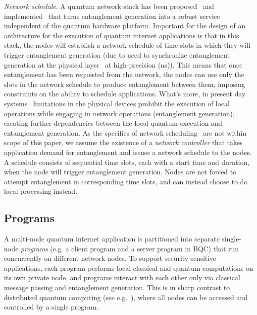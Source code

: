 \textit{Network schedule}.
A quantum network stack has been proposed~\cite{dahlberg2019link} and implemented~\cite{pompili2022experimental} that turns entanglement generation into a robust service independent of the quantum hardware platform.
Important for the design of an architecture for the execution of quantum internet applications is that in this stack, the nodes will establish a network schedule of time slots in which they will trigger entanglement generation (due to need to synchronize entanglement generation at the physical layer~\cite{dahlberg2019link} at high-precision (ns)).
This means that once entanglement has been requested from the network, the nodes can use only the slots in the network schedule to produce entanglement between them, imposing constraints on the ability to schedule applications. What's more, in present day systems~\cite{pompili2021realization, krutyanskiy2023entanglement} limitations in the physical devices prohibit the execution of local operations while engaging in network operations (entanglement generation), creating further dependencies between the local quantum execution and entanglement generation. 
As the specifics of network scheduling~\cite{network-scheduling, skrzypczyk2021architecture} are not within scope of this paper,
we assume the existence of a \textit{network controller} that takes application demand for entanglement and issues a network schedule to the nodes. 
A schedule consists of sequential time slots, each with a start time and duration, when the node will trigger entanglement generation.
Nodes are not forced to attempt entanglement in corresponding time slots, and can instead choose to do local processing instead.

\subsection{Programs}

A multi-node quantum internet application is partitioned into separate single-node \textit{programs} (e.g. a client program and a server program in BQC) that run concurrently on different network nodes. To support security sensitive applications, each program performs local classical and quantum computations on its own private node, and programs interact with each other only via classical message passing and entanglement generation. This is in sharp contrast to distributed quantum computing (see e.g.~\cite{cacciapuoti2019quantum}), where all nodes can be accessed and controlled by a single program. 



